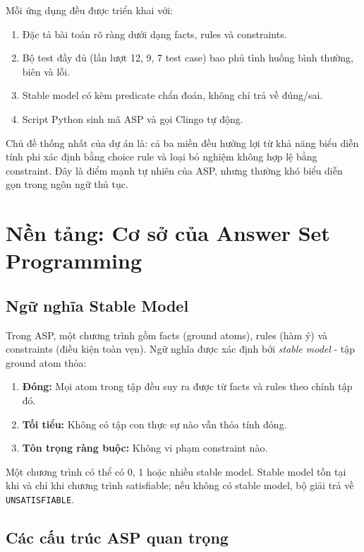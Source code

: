 \documentclass[a4paper,11pt]{article}
\begin{document}
Mỗi ứng dụng đều được triển khai với:
\begin{enumerate}
  \item Đặc tả bài toán rõ ràng dưới dạng facts, rules và constraints.
  \item Bộ test đầy đủ (lần lượt 12, 9, 7 test case) bao phủ tình huống bình thường, biên và lỗi.
  \item Stable model có kèm predicate chẩn đoán, không chỉ trả về đúng/sai.
  \item Script Python sinh mã ASP và gọi Clingo tự động.
\end{enumerate}

Chủ đề thống nhất của dự án là: cả ba miền đều hưởng lợi từ khả năng biểu diễn tính phi xác định bằng
choice rule và loại bỏ nghiệm không hợp lệ bằng constraint. Đây là điểm mạnh tự nhiên của ASP,
nhưng thường khó biểu diễn gọn trong ngôn ngữ thủ tục.

\section{Nền tảng: Cơ sở của Answer Set Programming}\label{sec:background}

\subsection{Ngữ nghĩa Stable Model}

Trong ASP, một chương trình gồm facts (ground atoms), rules (hàm ý) và constraints (điều kiện toàn vẹn).
Ngữ nghĩa được xác định bởi \emph{stable model} - tập ground atom thỏa:
\begin{enumerate}
  \item \textbf{Đóng:} Mọi atom trong tập đều suy ra được từ facts và rules theo chính tập đó.
  \item \textbf{Tối tiểu:} Không có tập con thực sự nào vẫn thỏa tính đóng.
  \item \textbf{Tôn trọng ràng buộc:} Không vi phạm constraint nào.
\end{enumerate}

Một chương trình có thể có 0, 1 hoặc nhiều stable model. Stable model tồn tại khi và chỉ khi
chương trình satisfiable; nếu không có stable model, bộ giải trả về \texttt{UNSATISFIABLE}.

\subsection{Các cấu trúc ASP quan trọng}
\end{document}
